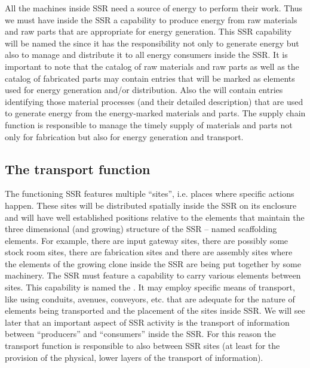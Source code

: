 All the machines inside SSR need
a source of energy to perform their work. Thus we must have inside the
SSR a capability to produce energy from raw materials and raw parts
that are appropriate for energy generation. This SSR capability will be
named the  since it
has the responsibility not only to generate energy but also to manage
and distribute it to all energy consumers inside the SSR. It is
important to note that the catalog of raw materials and raw parts as
well as the catalog of fabricated parts may contain entries that will
be marked as elements used for energy generation and/or distribution.
Also the  will contain entries identifying
those material processes (and their detailed description) that are used
to generate energy from the energy-marked materials and parts. The
supply chain function is responsible to manage the timely supply of
materials and parts not only for fabrication but also for energy
generation and transport.

\subsection[The transport function]{The transport function}

The functioning SSR features
multiple “sites”, i.e. places where specific actions happen. These
sites will be distributed spatially inside the SSR on its enclosure
and will have well established positions relative to the elements that
maintain the three dimensional (and growing) structure of the SSR –
named scaffolding elements. For example, there are input gateway sites,
there are possibly some stock room sites, there are fabrication sites
and there are assembly sites where the elements of the growing clone
inside the SSR are being put together by some machinery. The SSR must
feature a capability to carry various elements between sites. This
capability is named the . It may employ
specific means of transport, like using conduits, avenues, conveyors,
etc. that are adequate for the nature of elements being transported and
the placement of the sites inside SSR.  We will see later that an
important aspect of SSR activity is the transport of information
between “producers” and “consumers” inside the SSR. For this reason the
transport function is responsible to also  
between SSR sites (at least for the provision of the
physical, lower layers of the transport of information).

